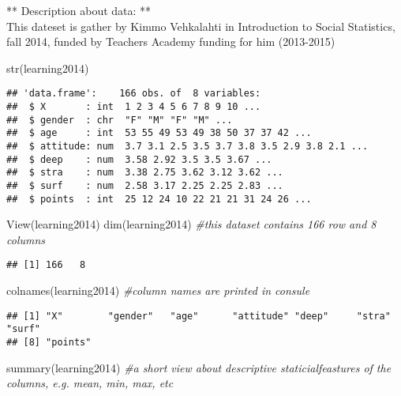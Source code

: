 \documentclass[
]{article}
\newenvironment{Shaded}{\begin{snugshade}}{\end{snugshade}}
\newcommand{\CommentTok}[1]{\textcolor[rgb]{0.56,0.35,0.01}{\textit{#1}}}
\newcommand{\FunctionTok}[1]{\textcolor[rgb]{0.00,0.00,0.00}{#1}}
\newcommand{\NormalTok}[1]{#1}
\begin{document}
** Description about data: **\\
This dateset is gather by Kimmo Vehkalahti in Introduction to Social
Statistics, fall 2014, funded by Teachers Academy funding for him
(2013-2015)

\begin{Shaded}
\begin{Highlighting}[]
\FunctionTok{str}\NormalTok{(learning2014)}
\end{Highlighting}
\end{Shaded}

\begin{verbatim}
## 'data.frame':    166 obs. of  8 variables:
##  $ X       : int  1 2 3 4 5 6 7 8 9 10 ...
##  $ gender  : chr  "F" "M" "F" "M" ...
##  $ age     : int  53 55 49 53 49 38 50 37 37 42 ...
##  $ attitude: num  3.7 3.1 2.5 3.5 3.7 3.8 3.5 2.9 3.8 2.1 ...
##  $ deep    : num  3.58 2.92 3.5 3.5 3.67 ...
##  $ stra    : num  3.38 2.75 3.62 3.12 3.62 ...
##  $ surf    : num  2.58 3.17 2.25 2.25 2.83 ...
##  $ points  : int  25 12 24 10 22 21 21 31 24 26 ...
\end{verbatim}

\begin{Shaded}
\begin{Highlighting}[]
\FunctionTok{View}\NormalTok{(learning2014)}
\FunctionTok{dim}\NormalTok{(learning2014) }\CommentTok{\#this dataset contains 166 row and 8 columns}
\end{Highlighting}
\end{Shaded}

\begin{verbatim}
## [1] 166   8
\end{verbatim}

\begin{Shaded}
\begin{Highlighting}[]
\FunctionTok{colnames}\NormalTok{(learning2014) }\CommentTok{\#column names are printed in consule}
\end{Highlighting}
\end{Shaded}

\begin{verbatim}
## [1] "X"        "gender"   "age"      "attitude" "deep"     "stra"     "surf"    
## [8] "points"
\end{verbatim}

\begin{Shaded}
\begin{Highlighting}[]
\FunctionTok{summary}\NormalTok{(learning2014) }\CommentTok{\#a short view about descriptive staticialfeastures of the columns, e.g. mean, min, max, etc}
\end{Highlighting}
\end{Shaded}
\end{document}
